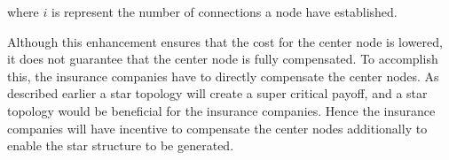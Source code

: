 where $i $ is represent the number of connections a node have established. 

Although this enhancement ensures that the cost for the center node is lowered, it does not guarantee that the center node is fully compensated. To accomplish this, the insurance companies have to directly compensate the center nodes. As described earlier a star topology will create a super critical payoff, and a star topology would be beneficial for the insurance companies. Hence the insurance companies will have incentive to compensate the center nodes additionally to enable the star structure to be generated. 




